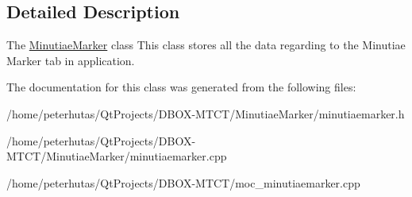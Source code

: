 \subsection{Detailed Description}
The \mbox{\hyperlink{class_minutiae_marker}{Minutiae\+Marker}} class This class stores all the data regarding to the Minutiae Marker tab in application. 

The documentation for this class was generated from the following files\+:\begin{DoxyCompactItemize}
\item 
/home/peterhutas/\+Qt\+Projects/\+D\+B\+O\+X-\/\+M\+T\+C\+T/\+Minutiae\+Marker/minutiaemarker.\+h\item 
/home/peterhutas/\+Qt\+Projects/\+D\+B\+O\+X-\/\+M\+T\+C\+T/\+Minutiae\+Marker/minutiaemarker.\+cpp\item 
/home/peterhutas/\+Qt\+Projects/\+D\+B\+O\+X-\/\+M\+T\+C\+T/moc\+\_\+minutiaemarker.\+cpp\end{DoxyCompactItemize}
